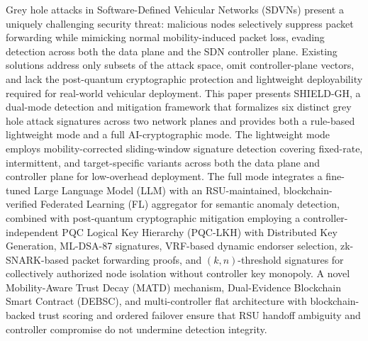 \documentclass[12pt, a4paper]{report}
\begin{document}
Grey hole attacks in Software-Defined Vehicular Networks (SDVNs) present a
uniquely challenging security threat: malicious nodes selectively suppress
packet forwarding while mimicking normal mobility-induced packet loss, evading
detection across both the data plane and the SDN controller plane. Existing
solutions address only subsets of the attack space, omit controller-plane
vectors, and lack the post-quantum cryptographic protection and lightweight
deployability required for real-world vehicular deployment. This paper presents
SHIELD-GH, a dual-mode detection and mitigation framework that formalizes six
distinct grey hole attack signatures across two network planes and provides
both a rule-based lightweight mode and a full AI-cryptographic mode. The
lightweight mode employs mobility-corrected sliding-window
signature detection covering fixed-rate, intermittent, and
target-specific variants across both the data plane and
controller plane for low-overhead deployment. The full mode integrates a fine-tuned Large Language Model (LLM) with an RSU-maintained, blockchain-verified Federated Learning (FL) aggregator for semantic anomaly detection, combined with post-quantum cryptographic mitigation employing
a controller-independent PQC Logical Key Hierarchy (PQC-LKH)
with Distributed Key Generation, ML-DSA-87 signatures,
VRF-based dynamic endorser selection, zk-SNARK-based packet
forwarding proofs, and $(k,n)$-threshold signatures for
collectively authorized node isolation without controller
key monopoly. A novel Mobility-Aware Trust Decay (MATD) mechanism,
Dual-Evidence Blockchain Smart Contract (DEBSC), and
multi-controller flat architecture with blockchain-backed
trust scoring and ordered failover ensure that RSU handoff
ambiguity and controller compromise do not undermine
detection integrity.



\newpage

\tableofcontents
\newpage

\listoffigures
\newpage

\listoftables
\newpage
\end{document}
